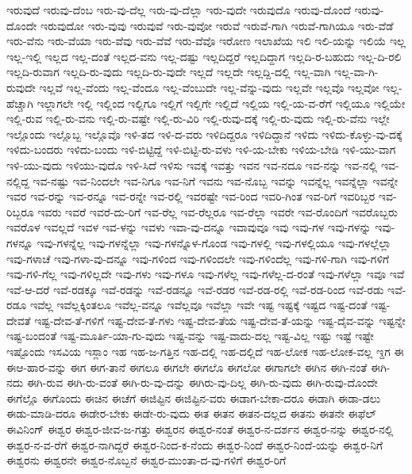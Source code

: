 {ಇರುವುದೆ
ಇರುವು-ದೆಂಬ
ಇರು-ವು-ದೆಲ್ಲ
ಇರು-ವು-ದೆಲ್ಲಾ
ಇರು-ವುದೇ
ಇರುವುದೊ
ಇರುವು-ದೊಂದೆ
ಇರುವು-ದೊಂದೇ
ಇರುವುದೋ
ಇರು-ವುವು
ಇರುವುವೆ
ಇರು-ವುವೋ
ಇರುವೆ
ಇರುವೆ-ಗಾಗಿ
ಇರುವೆ-ಗಾಗಿಯೂ
ಇರು-ವೆಡೆ
ಇರು-ವೆನು
ಇರು-ವೆಯಾ
ಇರು-ವೆವು
ಇರು-ವೆವೆ
ಇರು-ವೆವೊ
ಇರೋಣ
ಇಲಾಖೆಯ
ಇಲಿ
ಇಲಿ-ಯನ್ನು
ಇಲಿಯೆ
ಇಲ್ಲ
ಇಲ್ಲ-ಇಲ್ಲಿ
ಇಲ್ಲದ
ಇಲ್ಲ-ದಂತೆ
ಇಲ್ಲದ-ವನು
ಇಲ್ಲ-ದಷ್ಟು
ಇಲ್ಲದಿದ್ದರೆ
ಇಲ್ಲದಿದ್ದಾಗ
ಇಲ್ಲದಿ-ರ-ಬಹುದು
ಇಲ್ಲ-ದಿ-ರಲಿ
ಇಲ್ಲದಿ-ರುವಾಗ
ಇಲ್ಲದಿ-ರು-ವುದು
ಇಲ್ಲದಿ-ರು-ವುದೇ
ಇಲ್ಲದೆ
ಇಲ್ಲದೇ
ಇಲ್ಲದ್ದಿ-ದಲ್ಲಿ
ಇಲ್ಲ-ವಾಗಿ
ಇಲ್ಲ-ವಾ-ಗಿ-ರುವುದೇ
ಇಲ್ಲವೆ
ಇಲ್ಲ-ವೆಂದು
ಇಲ್ಲ-ವೆಂದೂ
ಇಲ್ಲ-ವೆಂಬುದೇ
ಇಲ್ಲ-ವೆನ್ನು-ವುದು
ಇಲ್ಲವೇ
ಇಲ್ಲವೊ
ಇಲ್ಲವೋ
ಇಲ್ಲ-ಹೆಚ್ಚಾಗಿ
ಇಲ್ಲಾಗಲೇ
ಇಲ್ಲಿ
ಇಲ್ಲಿಂದ
ಇಲ್ಲಿಗೂ
ಇಲ್ಲಿಗೆ
ಇಲ್ಲಿಗೇ
ಇಲ್ಲಿದೆ
ಇಲ್ಲಿಯ
ಇಲ್ಲಿ-ಯ-ವ-ರೆಗೆ
ಇಲ್ಲಿಯೂ
ಇಲ್ಲಿಯೇ
ಇಲ್ಲಿ-ರುವ
ಇಲ್ಲಿ-ರು-ವನು
ಇಲ್ಲಿ-ರು-ವಷ್ಟೇ
ಇಲ್ಲಿ-ರು-ವಿರಿ
ಇಲ್ಲಿ-ರುವು-ದಕ್ಕೆ
ಇಲ್ಲಿ-ರು-ವುದು
ಇಲ್ಲಿ-ರು-ವೆನು
ಇಲ್ಲೇ
ಇಲ್ಲೊಂದು
ಇಲ್ಲೊಬ್ಬ
ಇಲ್ಲೊವೊ
ಇಳಿ-ತದ
ಇಳಿ-ದ-ವರು
ಇಳಿದಿದ್ದರೂ
ಇಳಿದಿದ್ದಾನೆ
ಇಳಿದು
ಇಳಿದು-ಕೊಳ್ಳು-ವು-ದಕ್ಕೆ
ಇಳಿದು-ಬಂದರು
ಇಳಿದು-ಬಂದು
ಇಳಿ-ಬಿಟ್ಟಿದ್ದೆ
ಇಳಿ-ಬಿಟ್ಟಿ-ರು-ವಳು
ಇಳಿ-ಯ-ಬೇಕು
ಇಳಿಯ-ಬೇಡಿ
ಇಳಿ-ಯು-ವಾಗ
ಇಳಿ-ಯು-ವುದು
ಇಳಿಯು-ವುದೊ
ಇಳಿ-ಸಿದೆ
ಇಳಿಸು
ಇವಕ್ಕೆ
ಇವತ್ತು
ಇವನ
ಇವ-ನದೂ
ಇವ-ನನ್ನು
ಇವ-ನಲ್ಲಿ
ಇವ-ನಲ್ಲಿದ್ದ
ಇವ-ನಷ್ಟು
ಇವ-ನಿಂದಲೇ
ಇವ-ನಿಗೂ
ಇವ-ನಿಗೆ
ಇವನು
ಇವ-ನೊಬ್ಬ
ಇವನ್ನು
ಇವನ್ನೆಲ್ಲ
ಇವನ್ನೆಲ್ಲಾ
ಇವನ್ನೇ
ಇವರ
ಇವ-ರನ್ನು
ಇವ-ರನ್ನೂ
ಇವ-ರನ್ನೇ
ಇವ-ರಲ್ಲಿ
ಇವರಷ್ಟೇ
ಇವ-ರಿಂದ
ಇವರಿ-ಗಿಂತ
ಇವ-ರಿಗೆ
ಇವರಿಬ್ಬರ
ಇವ-ರಿಬ್ಬರೂ
ಇವರು
ಇವರೆ
ಇವರೆ-ದು-ರಿಗೆ
ಇವ-ರೆಲ್ಲ
ಇವ-ರೆಲ್ಲರೂ
ಇವ-ರೆಲ್ಲಾ
ಇವರೇ
ಇವ-ರೊಂದಿಗೆ
ಇವರೊಬ್ಬರು
ಇವರೊಳ
ಇವಲ್ಲದೆ
ಇವಳ
ಇವ-ಳನ್ನು
ಇವಳು
ಇವಾ-ವು-ದನ್ನೂ
ಇವಾವುವೂ
ಇವು
ಇವು-ಗಳ
ಇವು-ಗಳನ್ನು
ಇವು-ಗಳನ್ನೂ
ಇವು-ಗಳನ್ನೆಲ್ಲ
ಇವು-ಗಳನ್ನೆಲ್ಲಾ
ಇವು-ಗಳನ್ನೊಳ-ಗೊಂಡ
ಇವು-ಗಳಲ್ಲಿ
ಇವು-ಗಳಲ್ಲಿಯೂ
ಇವು-ಗಳಲ್ಲೆಲ್ಲಾ
ಇವು-ಗಳಾಚೆ
ಇವು-ಗಳಾ-ವು-ದನ್ನೂ
ಇವು-ಗಳಿಂದ
ಇವು-ಗಳಿಂದಲೇ
ಇವು-ಗಳಿಂದೆಲ್ಲ
ಇವು-ಗಳಿ-ಗಾಗಿ
ಇವು-ಗಳಿಗೆ
ಇವು-ಗಳಿ-ಗೆಲ್ಲ
ಇವು-ಗಳಿಲ್ಲದೇ
ಇವು-ಗಳು
ಇವು-ಗಳೂ
ಇವು-ಗಳೆಲ್ಲ
ಇವು-ಗಳೆಲ್ಲ-ದ-ರಂತೆ
ಇವು-ಗಳೆಲ್ಲಾ
ಇವೂ
ಇವೆ
ಇವೆ-ಆ-ದರೆ
ಇವೆ-ರಡಕ್ಕೂ
ಇವೆ-ರಡನ್ನು
ಇವೆ-ರಡನ್ನೂ
ಇವೆ-ರಡರ
ಇವೆ-ರಡ-ರಲ್ಲಿ
ಇವೆ-ರಡ-ರಿಂದ
ಇವೆ-ರಡು
ಇವೆ-ರಡೂ
ಇವೆಲ್ಲ
ಇವೆಲ್ಲಕ್ಕಿಂತಲೂ
ಇವೆಲ್ಲ-ವನ್ನೂ
ಇವೆಲ್ಲವೂ
ಇವೆಲ್ಲಾ
ಇವೇ
ಇಷ್ಟ
ಇಷ್ಟಕ್ಕೆ
ಇಷ್ಟದ
ಇಷ್ಟ-ದಂತೆ
ಇಷ್ಟ-ದೇವತೆ
ಇಷ್ಟ-ದೇವ-ತೆ-ಗಳಿಗೆ
ಇಷ್ಟ-ದೇವ-ತೆ-ಗಳು
ಇಷ್ಟ-ದೇವ-ತೆಯ
ಇಷ್ಟ-ದೇವ-ತೆ-ಯನ್ನು
ಇಷ್ಟ-ದೈವ-ವನ್ನು
ಇಷ್ಟನ್ನೇ
ಇಷ್ಟ-ಬಂದಂತೆ
ಇಷ್ಟ-ಮೂರ್ತಿ-ಯಾ-ಗು-ವುದು
ಇಷ್ಟ-ವನ್ನು
ಇಷ್ಟ-ವಾದು-ದಲ್ಲ
ಇಷ್ಟ-ವಿಲ್ಲ
ಇಷ್ಟು
ಇಷ್ಟೆ
ಇಷ್ಟೇ
ಇಷ್ಟೊಂದು
ಇಸವಿಯ
ಇಸ್ಲಾಂ
ಇಹ
ಇಹ-ಜ-ಗತ್ತಿನ
ಇಹ-ದಲ್ಲಿ
ಇಹ-ದಲ್ಲಿದೆ
ಇಹ-ಲೋಕ
ಇಹ-ಲೋಕ-ವಲ್ಲ
ಇ್ದಗ
ಈ
ಈಆ-ಹಾರ-ವನ್ನು
ಈಗ
ಈಗ-ತಾನೆ
ಈಗಲೂ
ಈಗಲೇ
ಈಗಲೊ
ಈಗಲೋ
ಈಗಾಗಲೇ
ಈಗಿನ
ಈಗಿ-ನಂತೆ
ಈಗಿ-ನದು
ಈಗಿ-ರುವ
ಈಗಿ-ರು-ವಂತೆ
ಈಗಿ-ರು-ವು-ದನ್ನು
ಈಗಿರು-ವು-ದಿಲ್ಲ
ಈಗಿ-ರು-ವುದು
ಈಗಿ-ರುವು-ದೊಂದೇ
ಈಗೆಲ್ಲೊ
ಈಗೊಂದು
ಈಚಿನ
ಈಚೆಗೆ
ಈಜಿಪ್ಟಿನ
ಈಜಿಪ್ಟಿನ-ವರು
ಈಡಾಗ-ಬೇಕಾ-ದರೂ
ಈಡಾಗಿ
ಈಡಾ-ಡಲು
ಈಡು-ಮಾಡಿ-ದರೂ
ಈಡೇರ-ಬೇಕು
ಈಡೇ-ರು-ವುದು
ಈತ
ಈತನ
ಈತನ-ದಲ್ಲದ
ಈತನು
ಈತನೇ
ಈಫೆಲ್
ಈವಿನಿಂಗ್
ಈಶ್ವರ
ಈಶ್ವರ-ಜೀವ-ಜ-ಗತ್ತು
ಈಶ್ವರನ
ಈಶ್ವರ-ನಂತೆ
ಈಶ್ವರ-ನ-ದರ್ಶನ
ಈಶ್ವರ-ನನ್ನು
ಈಶ್ವರ-ನಲ್ಲಿ
ಈಶ್ವರ-ನ-ವ-ರೆಗೆ
ಈಶ್ವರ-ನಾಗಿದ್ದರೆ
ಈಶ್ವರ-ನಿಂದ-ಕ-ನೆಂದು
ಈಶ್ವರ-ನಿಂದೆ
ಈಶ್ವರ-ನಿಂದೆ-ಯನ್ನು
ಈಶ್ವರ-ನಿಗೆ
ಈಶ್ವರನು
ಈಶ್ವರನೇ
ಈಶ್ವರ-ನೊಬ್ಬನೆ
ಈಶ್ವರ-ಮುಂತಾ-ದ-ವು-ಗಳಿಗೆ
ಈಶ್ವರ-ರಿಗೆ
}
